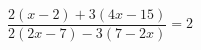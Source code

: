 \begin{ex}[type=equation]
	\begin{condition}
		$\dfrac{2(x- 2)+3(4x - 15)}{2(2x - 7) - 3(7-2x)} = 2$
	\end{condition}
	\answer{$\varnothing$}
\end{ex}